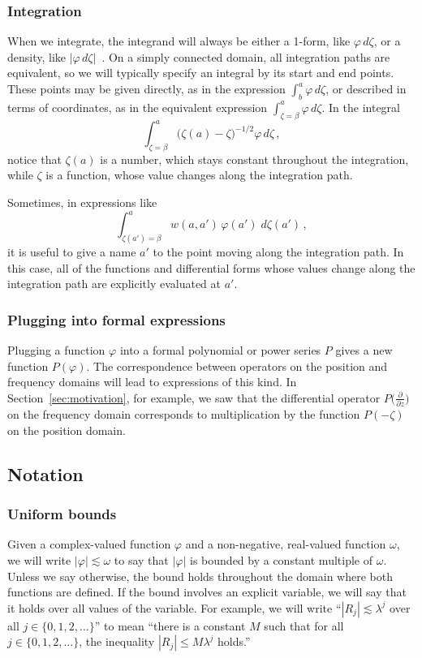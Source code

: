 \documentclass{article}
\theoremstyle{definition}
\theoremstyle{plain}
\newenvironment{revtwo}{\color{revred}}{\color{black}}
\newenvironment{revtwo}{}{}
\begin{document}
\subsubsection{Integration}
When we integrate, the integrand will always be either a 1-form, like $\varphi\,d\zeta$, or a density, like $|\varphi\,d\zeta|$~\cite[Section~1.8]{local-viewpoint}. On a simply connected domain, all integration paths are equivalent, so we will typically specify an integral by its start and end points. These points may be given directly, as in the expression $\int_b^a \varphi\,d\zeta$, or described in terms of coordinates, as in the equivalent expression $\int_{\zeta = \beta}^a \varphi\,d\zeta$. In the integral
\[ \int_{\zeta = \beta}^a \big(\zeta(a) - \zeta\big)^{-1/2} \varphi\,d\zeta\,, \]
notice that $\zeta(a)$ is a number, which stays constant throughout the integration, while $\zeta$ is a function, whose value changes along the integration path.

\begin{revtwo}
Sometimes, in expressions like
\[ \int_{\zeta(a') = \beta}^a w(a, a')\,\varphi(a')\;d\zeta(a')\,, \]
it is useful to give a name $a'$ to the point moving along the integration path. In this case, all of the functions and differential forms whose values change along the integration path are explicitly evaluated at $a'$.
\end{revtwo}
\subsubsection{Plugging into formal expressions}
Plugging a function $\varphi$ into a formal polynomial or power series $P$ gives a new function $P(\varphi)$. The correspondence between operators on the position and frequency domains will lead to expressions of this kind. In Section~\ref{sec:motivation}, for example, we saw that the differential operator $P\big(\tfrac{\partial}{\partial z}\big)$ on the frequency domain corresponds to multiplication by the function $P(-\zeta)$ on the position domain.
\subsection{Notation}
\subsubsection{Uniform bounds}
Given a complex-valued function $\varphi$ and a non-negative, real-valued function $\omega$, we will write $|\varphi| \lesssim \omega$ to say that $|\varphi|$ is bounded by a constant multiple of $\omega$. Unless we say otherwise, the bound holds throughout the domain where both functions are defined. If the bound involves an explicit variable, we will say that it holds over all values of the variable. For example, we will write ``$|R_j| \lesssim \lambda^j$ over all $j \in \{0, 1, 2, \ldots\}$'' to mean ``there is a constant $M$ such that for all $j \in \{0, 1, 2, \ldots\}$, the inequality $|R_j| \le M \lambda^j$ holds.''
\end{document}
